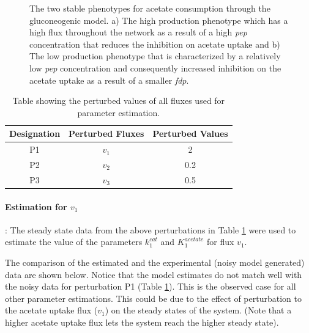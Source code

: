 \documentclass[10pt]{report}
\begin{document}
	\begin{figure}[!h]%
		\caption{The two stable phenotypes for acetate consumption through the gluconeogenic model. a) The high production phenotype which has a high flux throughout the network as a result of a high \textit{pep} concentration that reduces the inhibition on acetate uptake and b) The low production phenotype that is characterized by a relatively low \textit{pep} concentration and consequently increased inhibition on the acetate uptake as a result of a smaller \textit{fdp}.}\label{fig:fig1}
	\end{figure}

	\begin{table}[!tbhp]
		\caption{Table showing the perturbed values of all fluxes used for parameter estimation.}
		\begin{center}				
			\begin{tabular}{ccc}
				Designation & Perturbed Fluxes & Perturbed Values\\
				\hline
				P1 & $v_1$ & 2\\
				P2 & $v_2$ & 0.2\\
				P3 & $v_3$ & 0.5
			\end{tabular}
		\end{center}	
	\label{tab:pval}
	\end{table}
	
	\paragraph{Estimation for $v_1$}: The steady state data from the above perturbations in Table \ref{tab:pval} were used to estimate the value of the parameters $k_1^{cat}$ and $K_1^{acetate}$ for flux $v_1$.
	
	The comparison of the estimated and the experimental (noisy model generated) data are shown below. Notice that the model estimates do not match well with the noisy data for perturbation P1 (Table \ref{tab:pval}). This is the observed case for all other parameter estimations. This could be due to the effect of perturbation to the acetate uptake flux ($v_1$) on the steady states of the system. (Note that a higher acetate uptake flux lets the system reach the higher steady state).
	
\end{document}
